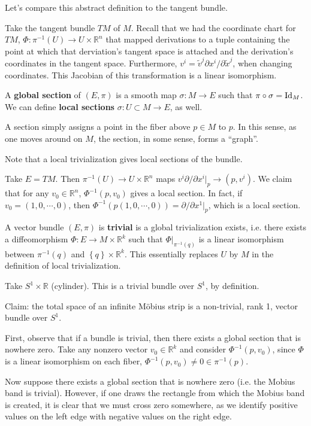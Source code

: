 \documentclass{../mathnotes}
\begin{document}
Let's compare this abstract definition to the tangent bundle.
\begin{exmp}
    Take the tangent bundle $TM$ of $M$. Recall that we had the coordinate chart for $TM$, $\Phi:\pi^{-1}(U)\to U\times \mathbb{R}^n$
    that mapped derivations to a tuple containing the point at which that derviation's tangent space is attached and the
    derivation's coordinates in the tangent space. Furthermore, $v^i=\tilde{v}^j\partial x^i/\partial\tilde{x}^j$, when
    changing coordinates. This Jacobian of this transformation is a linear isomorphism.
\end{exmp}

\begin{defn}
    A \textbf{global section} of $(E,\pi)$ is a smooth map $\sigma:M\to E$ such that $\pi\circ\sigma=\operatorname{Id}_M$.
    We can define \textbf{local sections} $\sigma:U\subset M\to E$, as well.
\end{defn}
A section simply assigns a point in the fiber above $p\in M$ to $p$. In this sense, as one moves around on $M$, the section,
in some sense, forms a ``graph''. 

Note that a local trivialization gives local sections of the bundle.
\begin{exmp}
    Take $E=TM$. Then $\pi^{-1}(U)\to U\times \mathbb{R}^n$ maps $v^i\partial/\partial x^i|_p\to(p,v^i)$. We claim that
    for any $v_0\in \mathbb{R}^n$, $\Phi^{-1}(p,v_0)$ gives a local section. In fact, if $v_0=(1, 0, \cdots, 0)$, then
    $\Phi^{-1}(p(1,0,\cdots,0))=\partial/\partial x^1|_p$, which is a local section.
\end{exmp}

\begin{defn}
    A vector bundle $(E,\pi)$ is \textbf{trivial} is a global trivialization exists, i.e. there exists a diffeomorphism $\Phi:E\to M\times \mathbb{R}^k$
    such that $\Phi|_{\pi^{-1}(q)}$ is a linear isomorphism between $\pi^{-1}(q)$ and $\left\{ q \right\}\times\mathbb{R}^k$. This essentially
    replaces $U$ by $M$ in the definition of local trivialization.
\end{defn}

\begin{exmp}
    Take $S^1\times \mathbb{R}$ (cylinder). This is a trivial bundle over $S^1$, by definition.
\end{exmp}

\begin{exmp}
    Claim: the total space of an infinite M\"{o}bius strip is a non-trivial, rank 1, vector bundle over $S^1$.

    First, observe that if a bundle is trivial, then there exists a global section that is nowhere zero. Take any nonzero vector $v_0\in\mathbb{R}^k$
    and consider $\Phi^{-1}(p,v_0)$, since $\Phi$ is a linear isomorphism on each fiber, $\Phi^{-1}(p,v_0)\neq0\in\pi^{-1}(p)$.

    Now suppose there exists a global section that is nowhere zero (i.e. the Mobius band is trivial). However, if one draws the rectangle
    from which the Mobius band is created, it is clear that we must cross zero somewhere, as we identify positive values on the left edge
    with negative values on the right edge.
\end{exmp}
\end{document}
